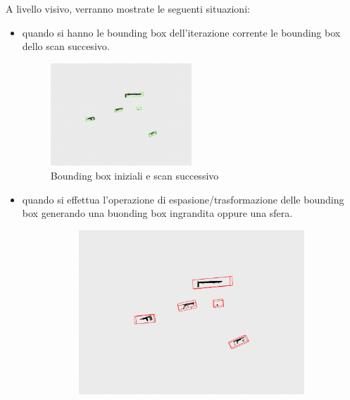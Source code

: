 \documentclass[italian]{report}
\begin{document}
A livello visivo, verranno mostrate le seguenti situazioni:
\begin{itemize}
	\item quando si hanno le bounding box dell'iterazione corrente le bounding box dello scan succesivo.
		\begin{figure}[H]
			\centering
			\includegraphics[width=0.5\textwidth]{startingpoint}
			\footnotesize
			\caption{Bounding box iniziali e scan successivo}
		\end{figure}
	\item quando si effettua l'operazione di espasione/trasformazione delle bounding box generando una buonding box ingrandita oppure una sfera.
		\begin{figure}[H]
			\centering
			\begin{subfigure}{0.45\textwidth}
				\includegraphics[width=\textwidth]{bbsExpanded}
			\end{subfigure}
			\begin{subfigure}{0.45\textwidth}

\end{subfigure}
\end{figure}
\end{itemize}
\end{document}

